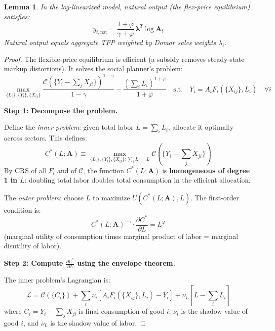 \documentclass[12pt]{article}
\newtheorem{lemma}{Lemma}
\begin{document}
\begin{lemma}
In the log-linearized model, natural output (the flex-price equilibrium) satisfies:
\begin{equation}
    y_{t,\mathrm{nat}} = \frac{1+\varphi}{\gamma+\varphi}\, \bm{\lambda}^T \log \mathbf{A}_t
\end{equation}
Natural output equals aggregate TFP weighted by Domar sales weights $\lambda_i$.
\end{lemma}

\begin{proof}
The flexible-price equilibrium is efficient (a subsidy removes steady-state markup distortions). It solves the social planner's problem:
\begin{equation}
    \max_{\{L_i\},\{Y_i\},\{X_{ij}\}} \frac{\mathcal{C}(\{Y_i - \sum_j X_{ji}\})^{1-\gamma}}{1-\gamma} - \frac{(\sum_i L_i)^{1+\varphi}}{1+\varphi}
    \quad \text{s.t.} \quad Y_i = A_i F_i(\{X_{ij}\}, L_i)\quad \forall i
    \label{eq:plannerprob}
\end{equation}

\medskip
\textbf{Step 1: Decompose the problem.}

Define the \textit{inner problem}: given total labor $L = \sum_i L_i$, allocate it optimally across sectors. This defines:
\begin{equation}
    C^*(L; \mathbf{A}) \equiv \max_{\{L_i\},\{Y_i\},\{X_{ij}\}: \sum_i L_i = L} \mathcal{C}(\{Y_i - \textstyle\sum_j X_{ji}\})
\end{equation}
By CRS of all $F_i$ and of $\mathcal{C}$, the function $C^*(L;\mathbf{A})$ is \textbf{homogeneous of degree 1 in $L$}: doubling total labor doubles total consumption in the efficient allocation.

The \textit{outer problem}: choose $L$ to maximize $U(C^*(L;\mathbf{A}), L)$. The first-order condition is:
\begin{equation}
    C^*(L;\mathbf{A})^{-\gamma} \cdot \frac{\partial C^*}{\partial L} = L^\varphi
    \label{eq:outerFOC}
\end{equation}
(marginal utility of consumption times marginal product of labor = marginal disutility of labor).

\medskip
\textbf{Step 2: Compute $\frac{\partial C^*}{\partial L}$ using the envelope theorem.}

The inner problem's Lagrangian is:
\begin{equation}
    \mathcal{L} = \mathcal{C}(\{C_i\}) + \sum_i \nu_i [A_i F_i(\{X_{ij}\}, L_i) - Y_i] + \nu_L [L - \sum_i L_i]
\end{equation}
where $C_i = Y_i - \sum_j X_{ji}$ is final consumption of good $i$, $\nu_i$ is the shadow value of good $i$, and $\nu_L$ is the shadow value of labor.


\end{proof}
\end{document}
